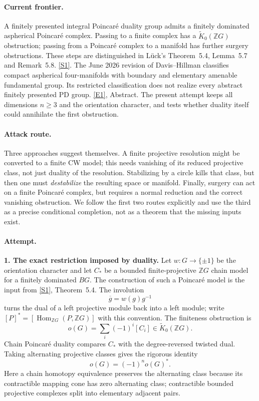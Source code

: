 \documentclass[11pt,a4paper]{article}
\newcommand{\Z}{\mathbb{Z}}
\newcommand{\sref}[2]{\hyperlink{source:#1:#2}{[S#2]}}
\newcommand{\eref}[2]{\hyperlink{extra:#1:#2}{[E#2]}}
\numberwithin{equation}{section}
\begin{document}
\paragraph{Current frontier.}
A finitely presented integral Poincar\'e duality group admits a finitely
dominated aspherical Poincar\'e complex. Passing to a finite complex has a
$\widetilde K_0(\Z G)$ obstruction; passing from a Poincar\'e complex to a
manifold has further surgery obstructions. These steps are distinguished
in L\"uck's Theorem~5.4, Lemma~5.7 and Remark~5.8.
\sref{30006797}{1}. The June 2026 revision of Davis--Hillman classifies
compact aspherical four-manifolds with boundary and elementary amenable
fundamental group. Its restricted classification does not realize every
abstract finitely presented PD group. \eref{30006797}{1}, Abstract.
The present attempt keeps all dimensions $n\ge3$ and the orientation
character, and tests whether duality itself could annihilate the first
obstruction.

\paragraph{Attack route.}
Three approaches suggest themselves. A finite projective resolution might
be converted to a finite CW model; this needs vanishing of its reduced
projective class, not just duality of the resolution. Stabilizing by a
circle kills that class, but then one must \emph{destabilize} the resulting
space or manifold. Finally, surgery can act on a finite Poincar\'e complex,
but requires a normal reduction and the correct vanishing obstruction.
We follow the first two routes explicitly and use the third as a precise
conditional completion, not as a theorem that the missing inputs exist.

\paragraph{Attempt.}
\textbf{1. The exact restriction imposed by duality.}
Let $w:G\to\{\pm1\}$ be the orientation character and let
$C_*$ be a bounded finite-projective $\Z G$ chain model for a finitely
dominated $BG$. The construction of such a Poincar\'e model is the input
from \sref{30006797}{1}, Theorem~5.4. The involution
\[
 \overline g=w(g)g^{-1}
\]
turns the dual of a left projective module back into a left module; write
$[P]^*=[\operatorname{Hom}_{\Z G}(P,\Z G)]$ with this convention.
The finiteness obstruction is
\[
 o(G)=\sum_i(-1)^i[C_i]\in\widetilde K_0(\Z G).
\]
Chain Poincar\'e duality compares $C_*$ with the degree-reversed twisted
dual. Taking alternating projective classes gives the rigorous identity
\begin{equation}\label{30006797:selfdual}
 o(G)=(-1)^n o(G)^*.
\end{equation}
Here a chain homotopy equivalence preserves the alternating class because
its contractible mapping cone has zero alternating class; contractible
bounded projective complexes split into elementary adjacent pairs.
\end{document}
